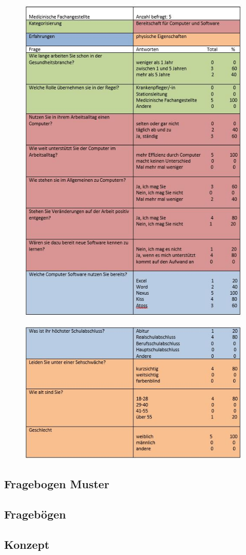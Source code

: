 \documentclass[11pt,
paper=a4,
bibtotocnumbered,	  %
liststotocnumbered,  %
DIV=calc,		  %
tablecaptionabove,	  %
headinclude,
]{article}
\begin{document}
\begin{figure}[H]
\includegraphics[width=1\textwidth]{Bilder/ausw3.jpg}
\end{figure}
\begin{figure}[H]
\includegraphics[width=1\textwidth]{Bilder/ausw4.jpg}
\end{figure}
\subsection{Fragebogen Muster}

\subsection{Fragebögen}
\subsection{Konzept}

\end{document}
